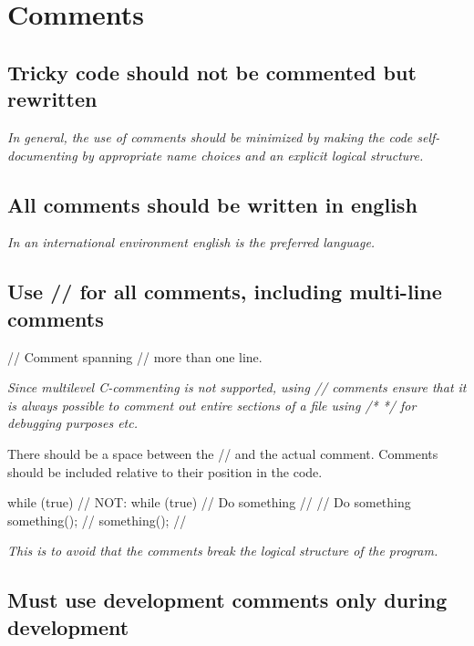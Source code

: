 \documentclass[a4paper,11pt,oneside]{scrbook}
\newcommand{\guideline}[1]{{\subsection{#1}}}
\newcommand{\motivation}[1]{{\normalfont \itshape #1}}
\newcommand{\trcode}[1]{{\normalfont \ttfamily #1}}
\begin{document}
\section{Comments}

\guideline{Tricky code should not be commented but rewritten}

\motivation{
  In general, the use of comments should be minimized by making the code
  self-documenting by appropriate name choices and an explicit logical
  structure.
}

\guideline{All comments should be written in english}

\motivation{
  In an international environment english is the preferred language.
}

\guideline{Use \trcode{//} for all comments, including multi-line comments}

\begin{code}
  // Comment spanning
  // more than one line. 
\end{code}

\motivation{
  Since multilevel C-commenting is not supported, using \trcode{//} comments
  ensure that it is always possible to comment out entire sections of a
  file using \trcode{/* */} for debugging purposes etc.
}

There should be a space between the \trcode{//} and the actual comment.
Comments should be included relative to their position in the code.

\begin{code}
  while (true) {          // NOT:    while (true) {
    // Do something       //         // Do something
    something();          //           something();
  }                       //         } 
\end{code}

\motivation{
  This is to avoid that the comments break the logical structure of the program.  
}

\guideline{Must use development comments only during development}
\end{document}
